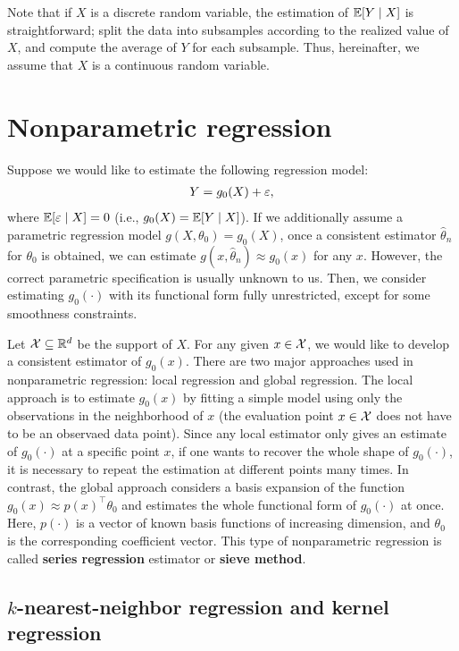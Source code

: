 \documentclass[11pt, A4paper, openany, uplatex]{book}
\begin{document}
Note that if $X$ is a discrete random variable, the estimation of $\mathbb{E}[Y \mid X]$ is straightforward; split the data into subsamples according to the realized value of $X$, and compute the average of $Y$ for each subsample.
Thus, hereinafter, we assume that $X$ is a continuous random variable.

\section{Nonparametric regression}

Suppose we would like to estimate the following regression model:
\begin{align}\label{eq:nonpara}
	Y = g_0(X) + \varepsilon,
\end{align}
where $\mathbb{E}[\varepsilon \mid X] = 0$ (i.e., $g_0(X) = \mathbb{E}[Y \mid X]$).
If we additionally assume a parametric regression model $g(X, \theta_0) = g_0(X)$, once a consistent estimator $\hat \theta_n$ for $\theta_0$ is obtained, we can estimate $g(x, \hat \theta_n) \approx g_0(x)$ for any $x$.
However, the correct parametric specification is usually unknown to us.
Then, we consider estimating $g_0(\cdot)$ with its functional form fully unrestricted, except for some smoothness constraints.

Let $\mathcal{X} \subseteq \mathbb{R}^d$ be the support of $X$.
For any given $x \in \mathcal{X}$, we would like to develop a consistent estimator of $g_0(x)$.
There are two major approaches used in nonparametric regression: local regression and global regression.
The local approach is to estimate $g_0(x)$ by fitting a simple model using only the observations in the neighborhood of $x$ (the evaluation point $x \in \mathcal{X}$ does not have to be an observaed data point).
Since any local estimator only gives an estimate of $g_0(\cdot)$ at a specific point $x$, if one wants to recover the whole shape of $g_0(\cdot)$, it is necessary to repeat the estimation at different points many times.
In contrast, the global approach considers a basis expansion of the function $g_0(x)\approx p(x)^\top \theta_0$ and estimates the whole functional form of $g_0(\cdot)$ at once.
Here, $p(\cdot)$ is a vector of known basis functions of increasing dimension, and $\theta_0$ is the corresponding coefficient vector.
This type of nonparametric regression is called \textbf{series regression} estimator or \textbf{sieve method}.

\subsection{$k$-nearest-neighbor regression and kernel regression}
\end{document}
